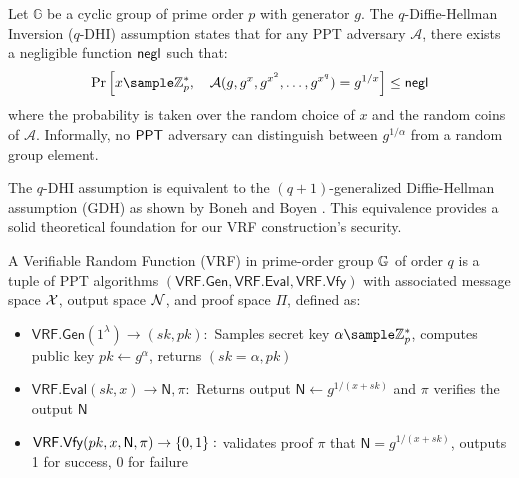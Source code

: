 \begin{definition}
Let $\mathbb{G}$ be a cyclic group of prime order $p$ with generator $g$. The $q$-Diffie-Hellman Inversion ($q$-DHI) assumption \cite{mitsunari_new_2002} states that for any PPT adversary $\mathcal{A}$, there exists a negligible function $\mathsf{negl}$ such that:
\[
\Pr\left[ x \sample \Zp^*, \quad \mathcal{A}(g, g^x, g^{x^2}, \ldots, g^{x^q}) = g^{1/x} \right] \leq \negl 
\]
where the probability is taken over the random choice of $x$ and the random coins of $\mathcal{A}$. Informally, no $\mathsf{PPT}$ adversary can distinguish between $g^{1/\alpha}$ from a random group element.
\end{definition}

\begin{remark}
The $q$-DHI assumption is equivalent to the $(q+1)$-generalized Diffie-Hellman assumption (GDH) as shown by Boneh and Boyen \cite{kanade_efficient_2004}. This equivalence provides a solid theoretical foundation for our VRF construction's security.
\end{remark}




\begin{definition}
A Verifiable Random Function (VRF) in prime-order group $\mathbb{G}$ of order $q$ is a tuple of PPT algorithms $(\mathsf{VRF.Gen}, \mathsf{VRF.Eval}, \mathsf{VRF.Vfy})$ with associated message space $\mathcal{X}$, output space $\mathcal{N}$, and proof space $\Pi$, defined as:

\begin{itemize}
    \item $\mathsf{VRF.Gen}(1^\lambda) \to (sk, pk):$ Samples secret key $\alpha \sample \Zp^*$, computes public key $pk \gets g^\alpha$, returns $(sk = \alpha, pk)$
    
    \item $\mathsf{VRF.Eval}(sk, x) \to \textsf{N}, \pi:$ Returns output $\textsf{N} \gets g^{1/(x+sk)}$ and $\pi$ verifies the output $\textsf{N}$
    
    \item $\mathsf{VRF.Vfy}(pk, x, \textsf{N}, \pi) \to \{0,1\}:$ validates proof $\pi$ that $\textsf{N} = g^{1/(x+sk)}$, outputs 1 for success, 0 for failure
\end{itemize}
\end{definition}

